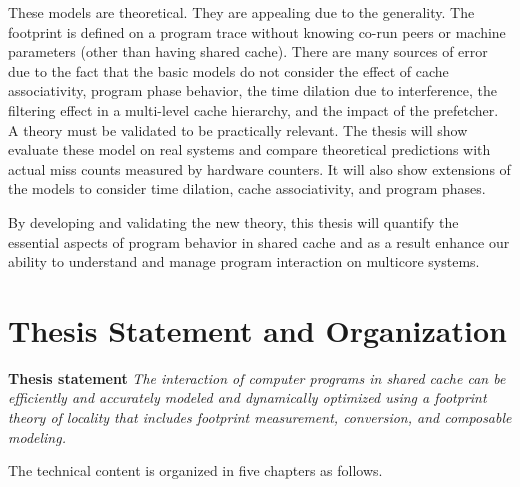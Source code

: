 These models are theoretical.  They are appealing due to the
generality.  The footprint is defined on a program trace without
knowing co-run peers or machine parameters (other than having shared
cache).  There are many sources of error due to the fact that the
basic models do not consider the effect of cache associativity,
program phase behavior, the time dilation due to interference, the
filtering effect in a multi-level cache hierarchy, and the impact of
the prefetcher.  A theory must be validated to be practically
relevant.  The thesis will show evaluate these model on real systems
and compare theoretical predictions with actual miss counts measured
by hardware counters.  It will also show extensions of the models to
consider time dilation, cache associativity, and program phases.
 
By developing and validating the new theory, this thesis will
quantify the essential aspects of program behavior in shared cache and
as a result enhance our ability to understand and manage program
interaction on multicore systems.


\section{Thesis Statement and Organization}

{\bf Thesis statement}  
\emph{The interaction of computer programs in shared cache can be
efficiently and accurately modeled and dynamically optimized using 
a footprint theory of locality that includes footprint measurement,
conversion, and composable modeling.}

The technical content is organized in five chapters as follows. 

